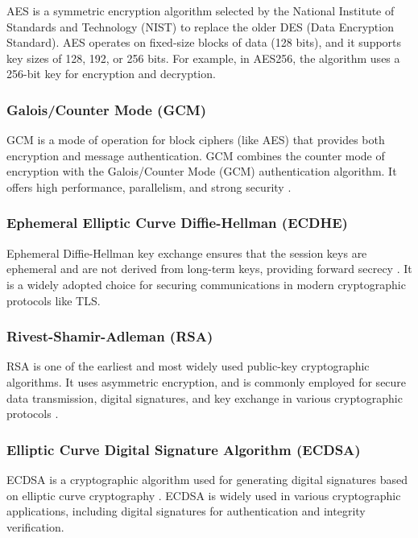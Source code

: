 \documentclass{l4proj}
\begin{document}
AES is a symmetric encryption algorithm selected by the National Institute of Standards and Technology (NIST) to replace the older DES (Data Encryption Standard). AES operates on fixed-size blocks of data (128 bits), and it supports key sizes of 128, 192, or 256 bits. For example, in AES256, the algorithm uses a 256-bit key for encryption and decryption.

\subsubsection{Galois/Counter Mode (GCM)}

GCM is a mode of operation for block ciphers (like AES) that provides both encryption and message authentication. GCM combines the counter mode of encryption with the Galois/Counter Mode (GCM) authentication algorithm. It offers high performance, parallelism, and strong security \citep{McGrew2005}.

\subsubsection{Ephemeral Elliptic Curve Diffie-Hellman (ECDHE)}

 Ephemeral Diffie-Hellman key exchange ensures that the session keys are ephemeral and are not derived from long-term keys, providing forward secrecy \citep{Siman2023}. It is a widely adopted choice for securing communications in modern cryptographic protocols like TLS.

 \subsubsection{Rivest-Shamir-Adleman (RSA)}

 RSA is one of the earliest and most widely used public-key cryptographic algorithms. It uses asymmetric encryption, and is commonly employed for secure data transmission, digital signatures, and key exchange in various cryptographic protocols \citep{Zhou2011}.

 \subsubsection{Elliptic Curve Digital Signature Algorithm (ECDSA)}
 
 ECDSA is a cryptographic algorithm used for generating digital signatures based on elliptic curve cryptography \citep{John2001}. ECDSA is widely used in various cryptographic applications, including digital signatures for authentication and integrity verification.
\end{document}

